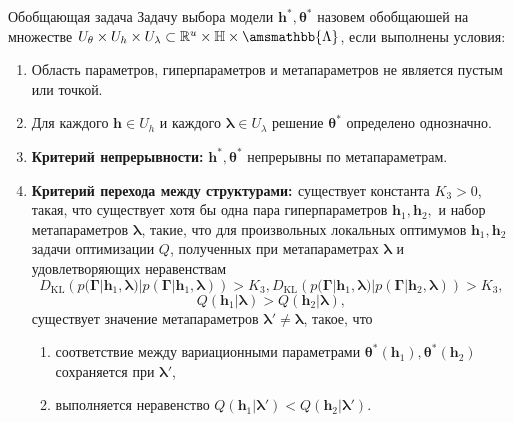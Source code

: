\documentclass[usenames,dvipsnames,11pt,pdf,utf8,russian,aspectratio=43]{beamer}
\begin{document}
   
\begin{frame}{Обобщающая задача}
\footnotesize
Задачу выбора модели $\mathbf{h}^{*}, \boldsymbol{\theta}^{*}$ назовем обобщаюшей на множестве $U_{\theta}\times U_{h} \times U_{\lambda} \subset \mathbb{R}^{u} \times \mathbb{H} \times \amsmathbb{\Lambda}$, если выполнены условия:
\begin{enumerate}
\item Область параметров, гиперпараметров и метапараметров не является пустым или точкой.
\item Для каждого $\mathbf{h} \in U_h$ и каждого $\boldsymbol{\lambda} \in U_{\lambda}$ решение $\boldsymbol{\theta}^{*}$ определено однозначно.


\item \textbf{Критерий непрерывности: } $\mathbf{h}^{*}, \boldsymbol{\theta}^{*}$ непрерывны по метапараметрам.
\item \textbf{Критерий \textcolor{OliveGreen}{перехода между структурами: }}
существует константа $K_3>0$, такая, что существует хотя бы одна пара гиперпараметров $\mathbf{h}_1, \mathbf{h}_2,$ и набор метапараметров $\boldsymbol{\lambda}$, такие, что для произвольных локальных оптимумов  $\mathbf{h}_1,\mathbf{h}_2$ задачи оптимизации $Q$, полученных при метапараметрах $\boldsymbol{\lambda}$ и удовлетворяющих неравенствам $$D_\text{KL}\left(p(\boldsymbol{\Gamma}| \mathbf{h}_1, \boldsymbol{\lambda}) | p(\boldsymbol{\Gamma}| \mathbf{h}_1, \boldsymbol{\lambda})\right) > K_3, D_\text{KL}\left(p(\boldsymbol{\Gamma}| \mathbf{h}_1, \boldsymbol{\lambda}) | p(\boldsymbol{\Gamma}| \mathbf{h}_2, \boldsymbol{\lambda})\right) > K_3,$$ $$Q(\mathbf{h}_1|\boldsymbol{\lambda})>Q(\mathbf{h}_2|\boldsymbol{\lambda}),$$  существует значение метапараметров $\boldsymbol{\lambda}' \neq \boldsymbol{\lambda}$, такое, что
\begin{enumerate}
\item соответствие между вариационными параметрами $\boldsymbol{\theta}^{*}(\mathbf{h}_1),\boldsymbol{\theta}^{*}(\mathbf{h}_2)$ сохраняется при  $\boldsymbol{\lambda}'$,
\item выполняется неравенство $Q(\mathbf{h}_1|\boldsymbol{\lambda}')<Q(\mathbf{h}_2|\boldsymbol{\lambda}')$.
\end{enumerate}



\end{enumerate}
\end{frame}
\end{document}
